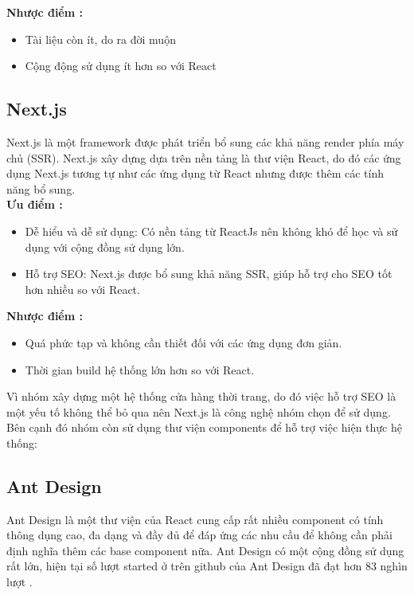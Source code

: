 \textbf{Nhược điểm \cite{technologyFE}:}
\begin{itemize}
    \item Tài liệu còn ít, do ra đời muộn
    \item Cộng động sử dụng ít hơn so với React
\end{itemize}

\subsection{Next.js}

\hspace*{0.5cm} Next.js là một framework được phát triển bổ sung các khả năng render phía máy chủ (SSR). Next.js xây dựng dựa trên nền tảng là thư viện React, do đó các ứng dụng Next.js tương tự như các ứng dụng từ React nhưng được thêm các tính năng bổ sung.\\


\textbf{Ưu điểm \cite{technologyNextAdvance}:}
\begin{itemize}
    \item Dễ hiểu và dễ sử dụng: Có nền tảng từ ReactJs nên không khó để học và sử dụng với cộng đồng sử dụng lớn.
    \item Hỗ trợ SEO: Next.js được bổ sung khả năng SSR, giúp hỗ trợ cho SEO tốt hơn nhiều so với React.
\end{itemize}

\textbf{Nhược điểm \cite{technologyNextAdvance}:}
\begin{itemize}
    \item Quá phức tạp và không cần thiết đối với các ứng dụng đơn giản.
    \item Thời gian build hệ thống lớn hơn so với React.
\end{itemize}

Vì nhóm xây dựng một hệ thống cửa hàng thời trang, do đó việc hỗ trợ SEO là một yếu tố không thể bỏ qua nên Next.js là công nghệ nhóm chọn để sử dụng. \\

Bên cạnh đó nhóm còn sử dụng thư viện components để hỗ trợ việc hiện thực hệ thống:

\subsection*{Ant Design}

\hspace*{0.5cm} Ant Design là một thư viện của React cung cấp rất nhiều component có tính thông dụng cao, đa dạng và đầy đủ để đáp ứng các nhu cầu để không cần phải định nghĩa thêm các base component nữa. Ant Design có một cộng đồng sử dụng rất lớn, hiện tại số lượt started ở trên github của Ant Design đã đạt hơn 83 nghìn lượt \cite{technologyAntdStar}.


